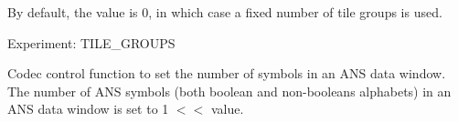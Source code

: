 \begin{Desc}
\begin{description}
By default, the value is 0, in which case a fixed number of tile groups is used.

Experiment\+: T\+I\+L\+E\+\_\+\+G\+R\+O\+U\+PS \item[{\em 
A\+V1\+E\+\_\+\+S\+E\+T\+\_\+\+A\+N\+S\+\_\+\+W\+I\+N\+D\+O\+W\+\_\+\+S\+I\+Z\+E\+\_\+\+L\+O\+G2\hypertarget{group__aom__encoder_ggae78dde67a6d78f332e9bdba0dde42db5a12575637cfea2f096a3f403933389979}{}\label{group__aom__encoder_ggae78dde67a6d78f332e9bdba0dde42db5a12575637cfea2f096a3f403933389979}
}]Codec control function to set the number of symbols in an A\+NS data window. The number of A\+NS symbols (both boolean and non-\/booleans alphabets) in an A\+NS data window is set to 1 $<$$<$ value.


\end{description}
\end{Desc}
